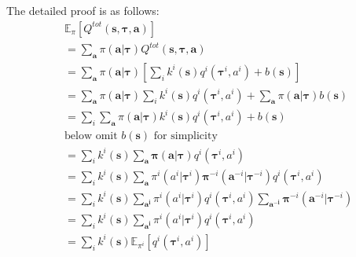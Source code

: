 \documentclass[runningheads]{llncs}
\begin{document}
The detailed proof is as follows:
\begin{equation}
	\begin{aligned}
		&\mathbb{E}_{\pi}
		\left[
		Q^{t o t}(
		\boldsymbol{s}, \boldsymbol{\tau}, \boldsymbol{a}
		)
		\right]\\
		&=\sum_{\boldsymbol{a}}
		\pi( \boldsymbol{a} | \boldsymbol{\tau} )
		Q^{t o t}(
		\boldsymbol{s}, \boldsymbol{\tau}, \boldsymbol{a}
		)
		\\
		&=\sum_{\boldsymbol{a}}
		\pi( \boldsymbol{a} | \boldsymbol{\tau} )
		\left[
		\sum_{i}
		k^{i}(\boldsymbol{s})
		q^{i}
		\left(
		\boldsymbol{\tau}^i, a^i
		\right)
		+b(\boldsymbol{s})
		\right] 
		\\
		&=\sum_{\boldsymbol{a}}
		\pi(\boldsymbol{a} | \boldsymbol{\tau})
		\sum_{i}
		k^{i}(\boldsymbol{s})
		q^{i}
		\left(
		\boldsymbol{\tau}^{i}, a^{i}
		\right)
		+\sum_{\boldsymbol{a}}
		\pi(\boldsymbol{a} | \boldsymbol{\tau})
		b(\boldsymbol{s})
		\\
		&=\sum_{i}
		\sum_{\boldsymbol{a}}
		\pi(\boldsymbol{a} | \boldsymbol{\tau})  
		k^{i}(\boldsymbol{s}) 
		q^{i}
		\left(
		\boldsymbol{\tau}^{i}, a^{i}
		\right)
		+ b(\boldsymbol{s})
		\\
		& \text{below omit } b(\boldsymbol{s}) \text{ for simplicity} \\
		&=\sum_{i} k^{i}(\boldsymbol{s}) \sum_{\boldsymbol{a}} \boldsymbol{\pi}(\boldsymbol{a} | \boldsymbol{\tau})   q^{i}\left(\boldsymbol{\tau}^{i}, a^{i}\right)\\
		&=\sum_{i} k^{i}(\boldsymbol{s}) \sum_{\boldsymbol{a}} {\pi}^{i}({a^i} | \boldsymbol{\tau}^{i}) \boldsymbol{\pi}^{-i}(\boldsymbol{a}^{-i} | \boldsymbol{\tau}^{-i}) q^{i}\left(\boldsymbol{\tau}^{i}, a^{i}\right)\\
		&=\sum_{i} k^{i}(\boldsymbol{s}) \sum_{\boldsymbol{a^i}}  {\pi}^{i}({a^i} | \boldsymbol{\tau}^{i}) q^{i}\left(\boldsymbol{\tau}^{i}, a^{i}\right) \sum_{\boldsymbol{a^{-i}}} \boldsymbol{\pi}^{-i}(\boldsymbol{a}^{-i} | \boldsymbol{\tau}^{-i})\\
		&=\sum_{i} k^{i}(\boldsymbol{s}) \sum_{\boldsymbol{a^i}} {\pi}^{i}({a^i} | \boldsymbol{\tau}^{i}) q^{i}\left(\boldsymbol{\tau}^{i}, a^{i}\right)\\
		&=\sum_{i} k^{i}(\boldsymbol{s}) \mathbb{E}_{{\pi}^{i}} \left[ q^{i}\left(\boldsymbol{\tau}^{i}, a^{i}\right)\right]
	\end{aligned}
\end{equation}
\end{document}
